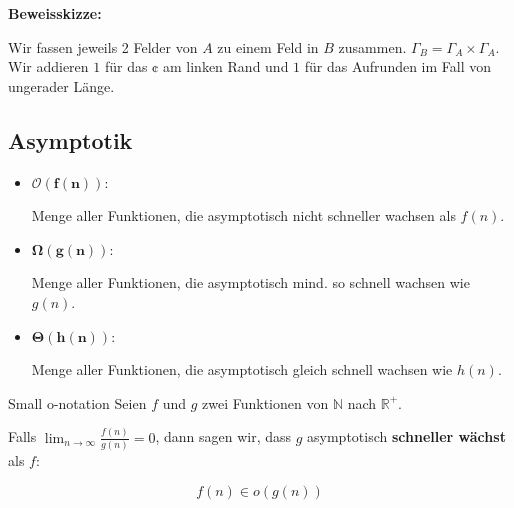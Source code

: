 \documentclass[a4paper, 11pt]{article}
\def\R{\mathbb{R}}
\def\N{\mathbb{N}}
\def\O{\mathcal{O}}
\begin{document}
                            \textbf{Beweisskizze: }
                        
                            Wir fassen jeweils 2 Felder von $A$ zu einem Feld in $B$ zusammen. $\Gamma_B = \Gamma_A \times \Gamma_A$. Wir addieren $1$ für das $\cent$ am linken Rand und $1$ für das Aufrunden im Fall von ungerader Länge.
                        
                            \subsection{Asymptotik}
                            \begin{itemize}[label=$\blacktriangleright$]
                                
                                \item $\mathbf{\O(f(n))}$: 
                                
                                Menge aller Funktionen, die asymptotisch nicht schneller wachsen als $f(n)$.
                                
                                \item $\boldsymbol{\Omega}\mathbf{(g(n))}$: 
                                
                                Menge aller Funktionen, die asymptotisch mind. so schnell wachsen wie $g(n)$.
                                
                                \item $\boldsymbol{\Theta}\mathbf{(h(n))}$: 
                                
                                Menge aller Funktionen, die asymptotisch gleich schnell wachsen wie $h(n)$.
                            \end{itemize}
                            
                            \begin{subbox}{Small o-notation}
                                Seien $f$ und $g$ zwei Funktionen von $\N$ nach $\R^+$. 
                        
                                Falls $\lim_{n \to \infty} \frac{f(n)}{g(n)} = 0$, dann sagen wir, dass $g$ asymptotisch \textbf{schneller wächst} als $f$: 
                        
                                $$f(n) \in o(g(n))$$
                            \end{subbox}
                       
\end{document}
